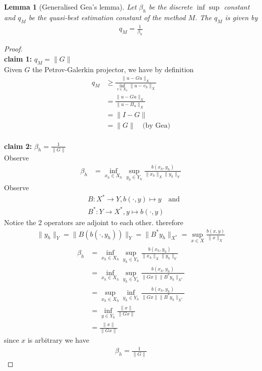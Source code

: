 \documentclass[a4paper,12pt,oneside,fleqn]{book}
\newtheorem{lemma}[theorem]{Lemma}
\theoremstyle{definition}
\theoremstyle{remark}
\begin{document}
\begin{lemma}[Generalised Gea's lemma]
Let $\beta_h$ be the discrete $\inf\sup$ constant and $q_M$ be the quasi-best estimation constant of the method $M$. 
The $q_M$ is given by 
\begin{align*}
	q_M = \frac{1}{\beta_h}
\end{align*}
\end{lemma}
\begin{proof}
\quad\\
\textbf{claim 1:} $q_M =\|G\|$\\
	Given $G$ the Petrov-Galerkin projector, we have by definition
	\begin{align*}
		q_M &\ge \frac{\|u - Gu\|_X}{\inf_{v \in X_h} \|u - v_h\|_X}\\
		&=\frac{\|u - Gu\|_X}{\|u - \Pi_u\|_X}\\
		&= \| I - G\|\\
		&= \|G\| \quad \text{(by Gea)}
	\end{align*}
	\quad\\
\textbf{claim 2: } $\beta_h = \frac{1}{\|G\|}$\\
Observe
\begin{align*}
	\beta_h &= \inf_{x_h \in X_h} \sup_{y_h \in Y_h} \frac{b(x_h, y_h)}{\|x_h\|_X \|y_h\|_Y}
\end{align*}
Observe 
\begin{align*}
	&B: X^* \rightarrow Y, b(\cdot, y) \mapsto y \quad \text{and}\\
	&B^*: Y \rightarrow X^*, y \mapsto b(\cdot, y)
\end{align*}
Notice the 2 operators are adjoint to each other. therefore
\begin{align*}
	\|y_h\|_Y =\| B(b(\cdot, y_h)) \|_Y = \|B^* y_h\|_{X^*}
	= \sup_{x \in X} \frac{b(x, y)}{\|x\|_X}
\end{align*}
\begin{align*}
		\beta_h &= \inf_{x_h \in X_h} \sup_{y_h \in Y_h} \frac{b(x_h, y_h)}{\|x_h\|_X \|y_h\|_Y}\\
	&= \inf_{x_h \in X_h}\sup_{y_h \in Y_h} \frac{b(x_h, y_h)}{\|G x\| \|B^* y_h\|_{X^*}}\\
	&= \sup_{x_h \in X_h}\inf_{y_h \in Y_h} \frac{b(x_h, y_h)}{\|G x\| \|B^* y_h\|_{X^*}}\\
	&= \inf_{y \in Y_h} \frac{\|x\|}{\|Gx\|}\\
	&= \frac{\|x\|}{\|Gx\|}
\end{align*}
since $x$ is arbitrary we have
\begin{align*}
	\beta_h = \frac{1}{\|G\|}
\end{align*}
\end{proof}
\end{document}
